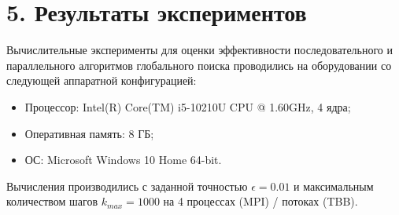 \documentclass{report}
\begin{document}
\section*{5. Результаты экспериментов}
Вычислительные эксперименты для оценки эффективности последовательного и параллельного алгоритмов глобального поиска проводились на оборудовании со следующей аппаратной конфигурацией:

\begin{itemize}
\item Процессор: Intel(R) Core(TM) i5-10210U CPU @ 1.60GHz, 4 ядра;
\item Оперативная память: 8 ГБ;
\item ОС: Microsoft Windows 10 Home 64-bit.
\end{itemize}
Вычисления производились с заданной точностью $\epsilon = 0.01$ и максимальным количеством шагов $k_{max} = 1000$ на 4 процессах (MPI) / потоках (TBB).
\end{document}
